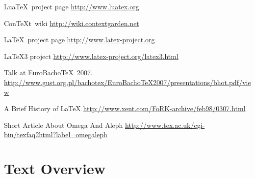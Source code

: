\documentclass{scrartcl}
\def\ConTeXt{Con\TeX{}t}
\begin{document}
\begin{thebibliography}{10}
{Lua\TeX\ project page}
\newblock \url{http://www.luatex.org}

\vspace{2ex}
\vspace{1ex}
\ConTeXt\ wiki
\newblock \url{http://wiki.contextgarden.net}

{\LaTeX\ project page}
\newblock \url{http://www.latex-project.org}

{\LaTeX3 project}
\newblock \url{http://www.latex-project.org/latex3.html}

\vspace{2ex}
\vspace{1ex}
\newblock Talk at EuroBacho\TeX\ 2007.\\
\newblock \url{http://www.gust.org.pl/bachotex/EuroBachoTeX2007/presentations/bhot.pdf/view}

{A Brief History of \LaTeX}
\newblock \url{http://www.xent.com/FoRK-archive/feb98/0307.html}

{Short Article About Omega And Aleph}
\newblock \url{http://www.tex.ac.uk/cgi-bin/texfaq2html?label=omegaleph}
\end{thebibliography}

\clearpage
\part{\color{blue}Text Overview}
\newpage
\setcounter{section}{0}
\end{document}
